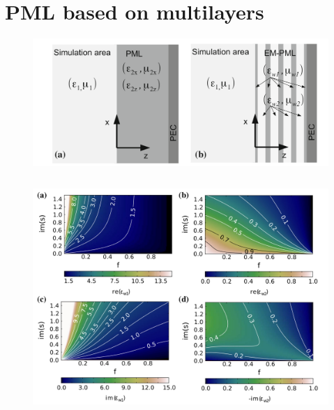 \documentclass{beamer}
\begin{document}
\section{PML based on multilayers}
\begin{frame}
	\begin{figure}
				\includegraphics[width=\textwidth]{../images/pml/oqe_schemat.png}
			\end{figure}

	\begin{columns}
		\begin{column}{0.5\textwidth}

		\end{column}
		\begin{column}{0.5\textwidth}

		\end{column}
	\end{columns}
	{\tiny \cite{ania2015}	}
\end{frame}

\begin{frame}
	\begin{figure}
				\includegraphics[width=\textwidth]{../images/pml/oqe_materials.png}
	\end{figure}
		
\end{frame}
\end{document}
